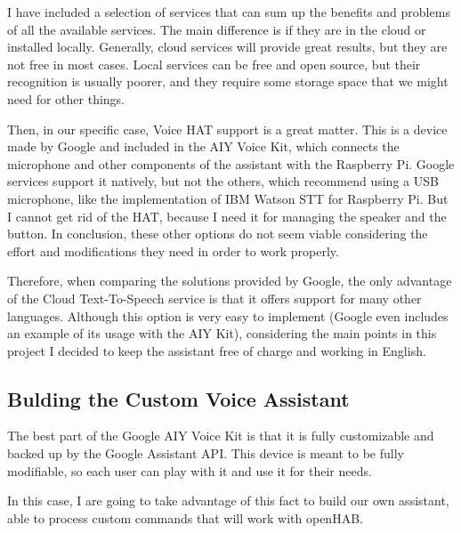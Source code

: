 \addtocounter{footnote}{-2}

I have included a selection of services that can sum up the benefits and problems of all the available services. The main difference
is if they are in the cloud or installed locally. Generally, cloud services will provide great results, but they are not free in
most cases. Local services can be free and open source, but their recognition is usually poorer, and they require some storage
space that we might need for other things.

Then, in our specific case, Voice HAT support is a great matter. This is a device made by Google and included in the AIY Voice Kit,
which connects the microphone and other components of the assistant with the Raspberry Pi. Google services support it natively,
but not the others, which recommend using a USB microphone, like the implementation of IBM Watson STT for Raspberry Pi. But I
cannot get rid of the HAT, because I need it for managing the speaker and the button. In conclusion, these other options do not
seem viable considering the effort and modifications they need in order to work properly.

Therefore, when comparing the solutions provided by Google, the only advantage of the Cloud Text-To-Speech service is that it offers
support for many other languages. Although this option is very easy to implement (Google even includes an example of its usage with
the AIY Kit), considering the main points in this project I decided to keep the assistant free of charge and working in English.

\subsection{Bulding the Custom Voice Assistant}
The best part of the Google AIY Voice Kit is that it is fully customizable and backed up by the Google Assistant API. This device
is meant to be fully modifiable, so each user can play with it and use it for their needs.

In this case, I are going to take advantage of this fact to build our own assistant, able to process custom commands that will
work with openHAB.

